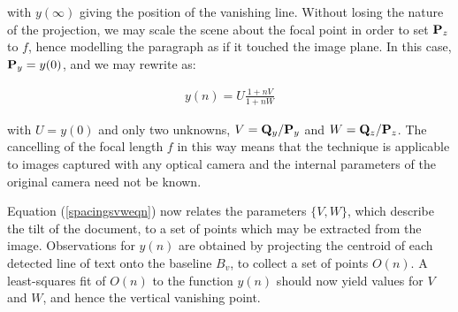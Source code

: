 {\parindent 0mm
with $y(\infty)$ giving the position of the vanishing line.
Without losing the nature of the projection, we may scale the scene about the focal point in order to set ${ \bf P }_z$ to $f$, hence modelling the paragraph as if it touched the image plane.  In this case, ${ \bf P }_y=y(0)$,
and we may rewrite  as:
}

\begin{eqnarray}
y(n) = U \frac{ 1 + nV }{ 1 + nW } \label{spacingsvweqn}
\end{eqnarray}

{ \parindent 0mm
with $U=y(0)$ and only two unknowns,
$V = {{ \bf Q }_y}/{{ \bf P }_y}$ and $W = {{ \bf Q }_z}/{{ \bf P }_z}$.
The cancelling of the focal length $f$ in this way means that the technique is applicable to images captured with any optical camera and the internal parameters of the original camera need not be known.

Equation (\ref{spacingsvweqn}) now relates the parameters $\{V,W\}$, which describe the
tilt of the document, to a set of points which may be extracted from the
image.
Observations for $y(n)$ are obtained by projecting the centroid of
each detected line of text onto the baseline $B_v$, to collect a set of
points $O(n)$.
A least-squares fit of $O(n)$ to the function $y(n)$ should now yield values for $V$ and $W$, and hence the vertical vanishing point.

}
